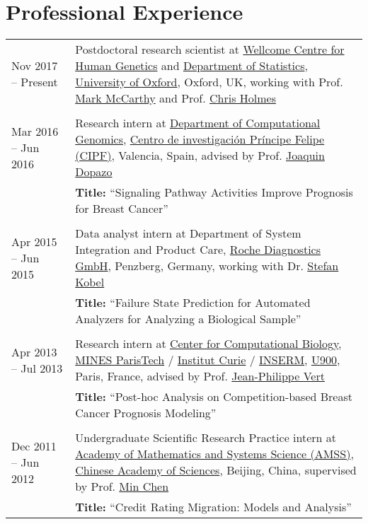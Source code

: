 \documentclass[10pt,a4paper]{article}
\begin{document}
\section*{Professional Experience}

\begin{center}
\small
\begin{tabularx}{\textwidth}{p{2.9cm}|X}

\hfill
Nov 2017 -- Present & Postdoctoral research scientist at \href{http://www.well.ox.ac.uk/}{Wellcome Centre for Human Genetics} and \href{http://www.stats.ox.ac.uk/}{Department of Statistics}, \href{http://www.ox.ac.uk/}{University of Oxford}, Oxford, UK, working with Prof. \href{https://www.ndm.ox.ac.uk/principal-investigators/researcher/mark-mccarthy}{Mark McCarthy} and Prof. \href{http://www.stats.ox.ac.uk/~cholmes/}{Chris Holmes}\\\\

\hfill
Mar 2016 -- Jun 2016 & Research intern at \href{http://bioinfo.cipf.es}{Department of Computational Genomics}, \href{http://www.cipf.es}{Centro de investigaci\'{o}n Pr\'{i}ncipe Felipe (CIPF)}, Valencia, Spain, advised by Prof. \href{http://bioinfo.cipf.es/jdopazo}{Joaquin Dopazo}\\
& \textbf{Title:} ``Signaling Pathway Activities Improve Prognosis for Breast Cancer''\\\\

\hfill
Apr 2015 -- Jun 2015 & Data analyst intern at Department of System Integration and Product Care, \href{http://www.roche.com}{Roche Diagnostics GmbH}, Penzberg, Germany, working with Dr. \href{https://www.linkedin.com/in/stefan-kobel-64786338}{Stefan Kobel}\\
& \textbf{Title:} ``Failure State Prediction for Automated Analyzers for Analyzing a Biological Sample''\\\\

\hfill
Apr 2013 -- Jul 2013 & Research intern at \href{http://cbio.ensmp.fr}{Center for Computational Biology}, \href{http://www.mines-paristech.fr}{MINES ParisTech} / \href{http://www.curie.fr/}{Institut Curie} / \href{http://www.inserm.fr}{INSERM}, \href{http://u900.curie.fr}{U900}, Paris, France, advised by Prof. \href{http://cbio.mines-paristech.fr/~jvert/}{Jean-Philippe Vert}\\
& \textbf{Title:} ``Post-hoc Analysis on Competition-based Breast Cancer Prognosis Modeling''\\\\

\hfill
Dec 2011 -- Jun 2012 & Undergraduate Scientific Research Practice intern at \href{http://www.amss.cas.cn}{Academy of Mathematics and Systems Science (AMSS)}, \href{http://www.cas.cn}{Chinese Academy of Sciences}, Beijing, China, supervised by Prof. \href{http://www.amt.ac.cn/member/chenmin/index.html}{Min Chen}\\
& \textbf{Title:} ``Credit Rating Migration: Models and Analysis''
\end{tabularx}
\end{center}
\end{document}
